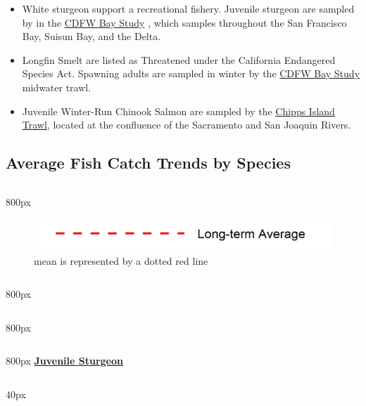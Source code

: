 \documentclass[
]{book}
\providecommand{\tightlist}{%
  \setlength{\itemsep}{0pt}\setlength{\parskip}{0pt}}
\begin{document}
\begin{itemize}
\tightlist
\item
  White sturgeon support a recreational fishery. Juvenile sturgeon are sampled by in the \href{https://wildlife.ca.gov/Conservation/Delta/Bay-Study}{CDFW Bay Study} , which samples throughout the San Francisco Bay, Suisun Bay, and the Delta.
\item
  Longfin Smelt are listed as Threatened under the California Endangered Species Act. Spawning adults are sampled in winter by the \href{https://wildlife.ca.gov/Conservation/Delta/Bay-Study}{CDFW Bay Study} midwater trawl.
\item
  Juvenile Winter-Run Chinook Salmon are sampled by the \href{https://www.fws.gov/lodi/juvenile_fish_monitoring_program/jfmp_index.htm}{Chipps Island Trawl}, located at the confluence of the Sacramento and San Joaquin Rivers.
\end{itemize}

\hypertarget{average-fish-catch-trends-by-species-5}{%
\subsection{Average Fish Catch Trends by Species}\label{average-fish-catch-trends-by-species-5}}

\begin{column}{800px\textwidth}
\begin{figure}
\includegraphics[width=15.25in]{figures/mline} \caption{mean is represented by a dotted red line}\label{fig:unnamed-chunk-169}
\end{figure}
\end{column}

\begin{column}{800px\textwidth}
\end{column}

\begin{column}{800px\textwidth}
\end{column}

\begin{column}{800px\textwidth}
\textbf{\href{http://calfish.ucdavis.edu/species/?uid=182\&ds=698}{Juvenile Sturgeon}}
\end{column}

\begin{column}{40px\textwidth}
~
\end{column}
\end{document}
